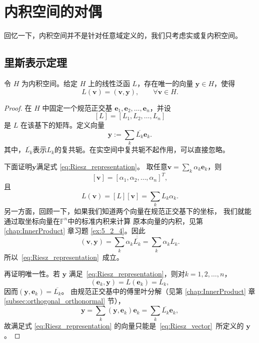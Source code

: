 \section{内积空间的对偶}

回忆一下，内积空间并不是针对任意域定义的，我们只考虑实或复内积空间。

\subsection{里斯表示定理}

\begin{theorem}[里斯表示定理]\label{thm:Riesz_representation}
    令 $H$ 为内积空间。给定 $H$ 上的线性泛函 $L$，存在唯一的向量 $\mathbf{y}\in H$，使得
    \begin{equation}\label{eq:Riesz_representation}
        L(\mathbf{v})=(\mathbf{v},\mathbf{y}),
        \qquad \forall\mathbf{v}\in H.
    \end{equation}
\end{theorem}

\begin{proof}
    在 $H$ 中固定一个规范正交基
    $\mathbf{e}_1,\mathbf{e}_2,\ldots,\mathbf{e}_n$，并设
    \[
        [L]=[L_1,L_2,\ldots,L_n]
    \]
    是 $L$ 在该基下的矩阵。定义向量
    \begin{equation}\label{eq:Riesz_vector}
        \mathbf{y}:=\sum_k\overline{L_k}\mathbf{e}_k.
    \end{equation}
    其中，$\overline{L_k}$表示${L_k}$的复共轭。在实空间中复共轭不起作用，可以直接忽略。

    下面证明$\mathbf{y}$满足式 \eqref{eq:Riesz_representation}。
    取任意$\mathbf{v}=\sum_k\alpha_k\mathbf{e}_k$，则
    \[
    [\mathbf{v}]=[\alpha_1,\alpha_2,\dots,\alpha_n]^T,
    \]
    且
    \[
        L(\mathbf{v})=[L][\mathbf{v}]=\sum_kL_k\alpha_k.
    \]
    另一方面，回顾一下，如果我们知道两个向量在规范正交基下的坐标，
    我们就能通过取坐标向量在$\mathbb{F}^n$中的标准内积来计算
    原本向量的内积，见第 \ref{chap:InnerProduct} 章习题 \ref{ex:5_2_4}。因此
    \[
        (\mathbf{v},\mathbf{y})
        =\sum_k\alpha_k\overline{\overline{L_k}}
        =\sum_k\alpha_kL_k.
    \]
    所以~\eqref{eq:Riesz_representation}~成立。

    再证明唯一性。若 $\mathbf{y}$ 满足~\eqref{eq:Riesz_representation}，则对$k=1,2,\dots,n$，
    \[
        (\mathbf{e}_k,\mathbf{y})=L(\mathbf{e}_k)=L_k,
    \]
    因而$(\mathbf{y},\mathbf{e}_k)=\overline{L_k}$。
    由规范正交基中的傅里叶分解（见第 \ref{chap:InnerProduct} 章 \ref{subsec:orthogonal_orthonormal} 节），
    \[
        \mathbf{y}
        =\sum_k(\mathbf{y},\mathbf{e}_k)\mathbf{e}_k
        =\sum_k\overline{L_k}\mathbf{e}_k,
    \]
    故满足式 \eqref{eq:Riesz_representation} 的向量只能是~\eqref{eq:Riesz_vector}~所定义的 $\mathbf{y}$。
\end{proof}


